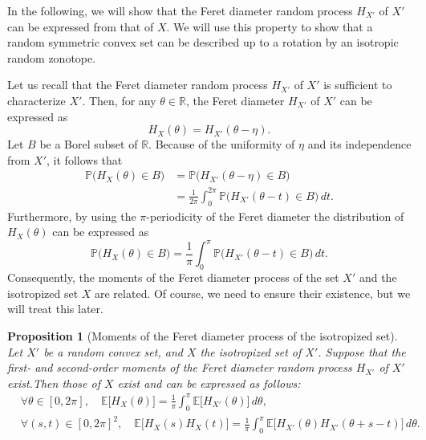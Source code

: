 \documentclass[numbers,compress,v1.0.1]{vmsta}
\newtheorem{proposition}{Proposition}
\theoremstyle{definition}
\begin{document}
In the following, we will show that the Feret diameter random process
$H_{X'}$ of $X'$ can be expressed from that of $X$. We will use this
property to show that a random symmetric convex set can be described up
to a rotation by an isotropic random zonotope.

Let us recall that the Feret diameter random process $H_{X'}$ of $X'$
is sufficient to characterize $X'$. Then, for any $\theta\in\mathbb
{R}$, the Feret diameter $H_{X'}$ of $X'$ can be expressed as
%
\begin{equation*}
H_{X}(\theta)=H_{X'}(\theta-\eta).
\end{equation*}
%
Let $ B$ be a Borel subset of $\mathbb{R}$. Because of the uniformity
of $\eta$ and its independence from $X'$, it follows that
%
\begin{align*}
\mathbb{P}\bigl( H_{X}(\theta)\in B\bigr) &=\mathbb{P}
\bigl(H_{X'}(\theta-\eta)\in B\bigr)
\\
&=\frac{1}{2\pi}\int_0^{2\pi}\mathbb{P}
\bigl(H_{X'}(\theta-t)\in B\bigr)\,dt.
\end{align*}
%
Furthermore, by using the $\pi$-periodicity of the Feret diameter the
distribution of $H_{X}(\theta)$ can be expressed as
%
\begin{equation}
\mathbb{P}\bigl( H_{X}(\theta)\in B\bigr)=\frac{1}{\pi}\int
_0^{\pi}\mathbb {P}\bigl(H_{X'}(\theta-t)
\in B\bigr)\,dt. \label{eq:distrHisotropised}
\end{equation}
%
Consequently, the moments of the Feret diameter process of the set $X'$
and the isotropized set $X$ are related. Of course, we need to ensure
their existence, but we will treat this later.

\begin{proposition}[Moments of the Feret diameter process of
the isotropized set]
Let $X'$ be a random convex set, and $X$ the isotropized set of $X'$.
Suppose that the first- and second-order moments of the Feret diameter
random process $H_{X'}$ of $X'$ exist.Then those of $X$ exist and can
be expressed as follows:
%
\begin{align*}
&\forall\theta\in[0,2\pi],\quad  \mathbb{E}\bigl[H_{X}(\theta) \bigr]=
\frac{1}{\pi
}\int_0^{\pi}\mathbb{E}
\bigl[H_{X'}(\theta) \bigr]\,d\theta,
\\
&\forall(s,t)\in[0,2\pi]^2,\quad  \mathbb{E}\bigl[H_{X}(s)H_{X}(t)
\bigr]=\frac
{1}{\pi}\int_0^{\pi}\mathbb{E}
\bigl[H_{X'}(\theta)H_{X'}(\theta+s-t) \bigr]\,d\theta.
\end{align*}
%
\label{prop:isotroVersionMomentsFeret}
\end{proposition}
\end{document}
